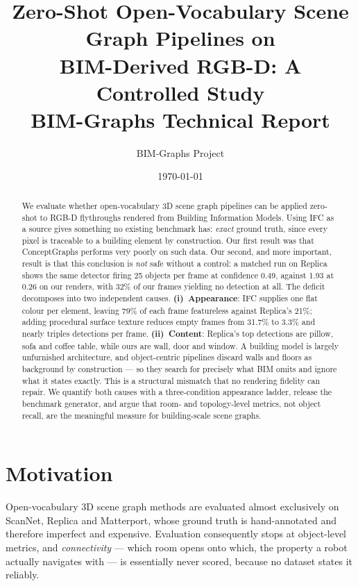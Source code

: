 \documentclass[11pt,a4paper]{article}
\title{\textbf{Zero-Shot Open-Vocabulary Scene Graph Pipelines on\\
BIM-Derived RGB-D: A Controlled Study}\\[0.4em]
\large BIM-Graphs Technical Report}
\author{BIM-Graphs Project}
\date{\today}
\begin{document}
\maketitle

\begin{abstract}
\noindent
We evaluate whether open-vocabulary 3D scene graph pipelines can be applied
zero-shot to RGB-D flythroughs rendered from Building Information Models. Using
IFC as a source gives something no existing benchmark has: \emph{exact} ground
truth, since every pixel is traceable to a building element by construction. Our
first result was that ConceptGraphs performs very poorly on such data. Our
second, and more important, result is that this conclusion is \emph{not} safe
without a control: a matched run on Replica shows the same detector firing 25
objects per frame at confidence 0.49, against 1.93 at 0.26 on our renders, with
32\% of our frames yielding no detection at all. The deficit decomposes into two
independent causes. \textbf{(i)~Appearance}: IFC supplies one flat colour per
element, leaving 79\% of each frame featureless against Replica's 21\%; adding
procedural surface texture reduces empty frames from 31.7\% to 3.3\% and nearly
triples detections per frame. \textbf{(ii)~Content}: Replica's top detections are
pillow, sofa and coffee table, while ours are wall, door and window. A building
model is largely unfurnished architecture, and object-centric pipelines discard
walls and floors as background by construction --- so they search for precisely
what BIM omits and ignore what it states exactly. This is a structural
mismatch that no rendering fidelity can repair. We quantify both causes with a
three-condition appearance ladder, release the benchmark generator, and argue
that room- and topology-level metrics, not object recall, are the meaningful
measure for building-scale scene graphs.
\end{abstract}

\section{Motivation}

Open-vocabulary 3D scene graph methods are evaluated almost exclusively on
ScanNet, Replica and Matterport, whose ground truth is hand-annotated and
therefore imperfect and expensive. Evaluation consequently stops at object-level
metrics, and \emph{connectivity} --- which room opens onto which, the property a
robot actually navigates with --- is essentially never scored, because no
dataset states it reliably.
\end{document}
